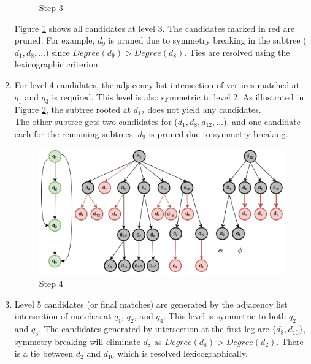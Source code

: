 \begin{enumerate}[Step 1:]
\begin{figure}
              \caption{Step 3}
              \label{fig:sgm-step3}
          \end{figure}
          Figure \ref{fig:sgm-step3} shows all candidates at level 3. 
          The candidates marked in red are pruned.
          For example, $d_9$ is pruned due to symmetry breaking in the subtree (${d_1, d_8, \dots}$) since $Degree(d_9) > Degree(d_8)$. 
          Ties are resolved using the lexicographic criterion.
    \item For level 4 candidates, the adjacency list intersection of vertices matched at $q_1$ and $q_3$ is required. This level is also symmetric to level 2.
          As illustrated in Figure \ref{fig:sgm-step4}, the subtree rooted at $d_{12}$ does not yield any candidates.\\
          The other subtree gets two candidates for ($d_1, d_8, d_{12}, \dots $). and one candidate each for the remaining subtrees.
          $d_9$ is pruned due to symmetry breaking.
          \begin{figure}
              \includegraphics[width=\textwidth]{fig/LR/sgm-step4.png}
              \caption{Step 4}
              \label{fig:sgm-step4}
          \end{figure}
    \item Level 5 candidates (or final matches) are generated by the adjacency list intersection of matches at $q_1$, $q_2$, and $q_4$. This level is symmetric to both $q_2$ and $q_3$.
          The candidates generated by intersection at the first leg are $\{d_8, d_{10}\}$, symmetry breaking will eliminate $d_8$ as $Degree(d_8)>Degree(d_2)$.
          There is a tie between $d_2$ and $d_{10}$ which is resolved lexicographically.
          \begin{figure}
          \centering

\end{figure}
\end{enumerate}
